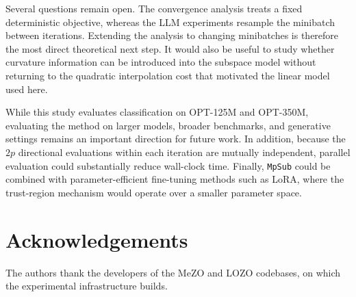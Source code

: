 \documentclass{siamart171218}
\begin{document}
Several questions remain open. The convergence analysis treats a fixed deterministic objective, whereas the LLM experiments resample the minibatch between iterations. Extending the analysis to changing minibatches is therefore the most direct theoretical next step. It would also be useful to study whether curvature information can be introduced into the subspace model without returning to the quadratic interpolation cost that motivated the linear model used here.

While this study evaluates classification on OPT-125M and OPT-350M, evaluating the method on larger models, broader benchmarks, and generative settings remains an important direction for future work. In addition, because the $2p$ directional evaluations within each iteration are mutually independent, parallel evaluation could substantially reduce wall-clock time. Finally, \texttt{MpSub} could be combined with parameter-efficient fine-tuning methods such as LoRA, where the trust-region mechanism would operate over a smaller parameter space.

\section*{Acknowledgements}
The authors thank the developers of the MeZO and LOZO codebases, on which the experimental infrastructure builds.



\end{document}
